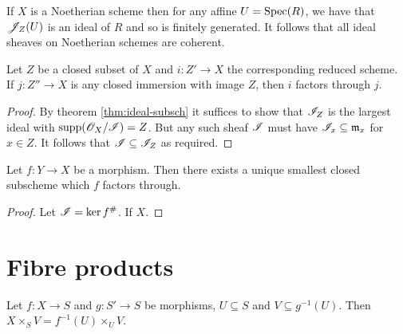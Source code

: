 \documentclass{memoir}
\begin{document}
\begin{remark}
    If $X$ is a Noetherian scheme then for any affine $U = \operatorname{Spec}(R)$, we have that $\mathscr{J}_Z(U)$ is an ideal of $R$ and so is finitely generated.
    It follows that all ideal sheaves on Noetherian schemes are coherent.
\end{remark}
\begin{proposition}
    Let $Z$ be a closed subset of $X$ and $i:Z'\to X$ the corresponding reduced scheme.
    If $j:Z''\to X$ is any closed immersion with image $Z$, then $i$ factors through $j$.
\end{proposition}
\begin{proof}
    By theorem \ref{thm:ideal-subsch} it suffices to show that $\mathscr{I}_Z$ is the largest ideal with $\text{supp}(\mathscr{O}_X/\mathscr{I}) = Z$.
    But any such sheaf $\mathscr{I}$ must have $\mathscr{I}_x\subseteq \mathfrak{m}_x$ for $x\in Z$.
    It follows that $\mathscr{I}\subseteq \mathscr{I}_Z$ as required.
\end{proof}
\begin{proposition}
    Let $f:Y\to X$ be a morphism. 
    Then there exists a unique smallest closed subscheme which $f$ factors through.
\end{proposition}
\begin{proof}
    Let $\mathscr{I} = \ker f^\#$.
    If $X$.
\end{proof}
\section{Fibre products}
\begin{proposition}
    Let $f:X\to S$ and $g:S'\to S$ be morphisms, $U\subseteq S$ and $V\subseteq g^{-1}(U)$.
    Then $X\times_SV = f^{-1}(U)\times_UV$.
\end{proposition}
\end{document}
